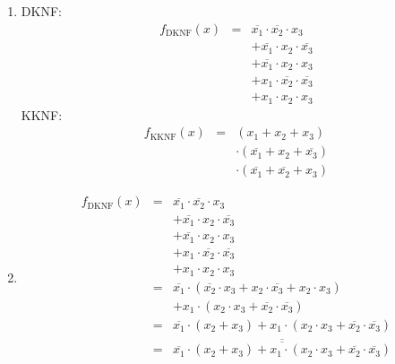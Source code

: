 \documentclass[DIN, pagenumber=false, fontsize=11pt, parskip=half]{scrartcl}
\begin{document}
    \subsection{}
    \begin{enumerate}[label=(\alph*)]
        \item
            DKNF:
            \begin{eqnarray*}
                f_\text{DKNF}(x) &=& \overline{x_1} \cdot \overline{x_2} \cdot x_3 \\
                &&+ \overline{x_1} \cdot x_2 \cdot \overline{x_3} \\
                &&+ \overline{x_1} \cdot x_2 \cdot x_3 \\
                &&+ x_1 \cdot \overline{x_2} \cdot \overline{x_3} \\
                &&+ x_1 \cdot x_2 \cdot x_3
            \end{eqnarray*}
            KKNF:
            \begin{eqnarray*}
                f_\text{KKNF}(x) &=& (x_1 + x_2 + x_3) \\
                &&\cdot (\overline{x_1} + x_2 + \overline{x_3})\\
                &&\cdot (\overline{x_1} + \overline{x_2} + x_3)
            \end{eqnarray*}
        \item
            \begin{eqnarray*}
                f_\text{DKNF}(x) &=& \overline{x_1} \cdot \overline{x_2} \cdot x_3 \\
                &&+ \overline{x_1} \cdot x_2 \cdot \overline{x_3} \\
                &&+ \overline{x_1} \cdot x_2 \cdot x_3 \\
                &&+ x_1 \cdot \overline{x_2} \cdot \overline{x_3} \\
                &&+ x_1 \cdot x_2 \cdot x_3\\
                &=& \overline{x_1} \cdot (\overline{x_2} \cdot x_3 + x_2 \cdot \overline{x_3} + x_2 \cdot x_3)\\
                &&+ x_1 \cdot (x_2 \cdot x_3 + \overline{x_2} \cdot \overline{x_3})\\
                &=& \overline{x_1} \cdot (x_2 + x_3) + x_1 \cdot (x_2 \cdot x_3 + \overline{x_2} \cdot \overline{x_3})\\
                &=& \overline{\overline{\overline{x_1} \cdot (x_2 + x_3) + x_1 \cdot (x_2 \cdot x_3 + \overline{x_2} \cdot \overline{x_3})}}\\

\end{eqnarray*}
\end{enumerate}
\end{document}

